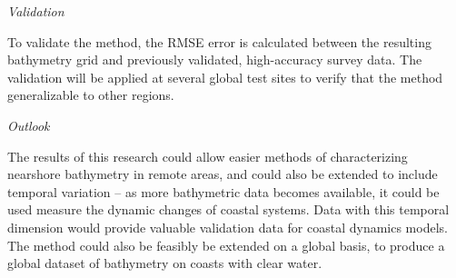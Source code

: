 \emph{Validation}

To validate the method, the RMSE error is calculated between the resulting bathymetry grid and previously validated, high-accuracy survey data. The validation will be applied at several global test sites to verify that the method generalizable to other regions.

\emph{Outlook} 

The results of this research could allow easier methods of characterizing nearshore bathymetry in remote areas, and could also be extended to include temporal variation – as more bathymetric data becomes available, it could be used measure the dynamic changes of coastal systems. Data with this temporal dimension would provide valuable validation data for coastal dynamics models. The method could also be feasibly be extended on a global basis, to produce a global dataset of bathymetry on coasts with clear water.
